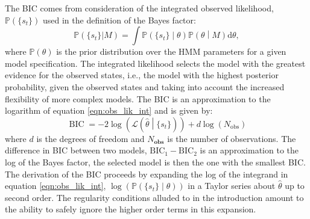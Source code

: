 The BIC comes from consideration of the integrated observed likelihood, $\mathbb{P}\left(\{s_t\}\right)$ used in the definition of the Bayes factor: 
\begin{equation}\label{eqn:obs_lik_int}
       \mathbb{P}\left(\{s_t\}|M\right) = \int \mathbb{P}\left(\{s_t\}\middle|\theta \right)\mathbb{P}\left(\theta \middle | M\right) \mathrm{d}\theta,
\end{equation}
where $\mathbb{P}(\theta)$ is the prior distribution over the HMM parameters for a given model specification. The integrated likelihood selects the model with the greatest evidence for the observed states, i.e., the model with the highest posterior probability, given the observed states and taking into account the increased flexibility of more complex models. \cite{mackay2003information}\cite{kassBayesFactors1995} The BIC is an approximation to the logarithm of equation \ref{eqn:obs_lik_int} and is given by:\cite{schwarzEstimatingDimensionModel1978a}
\begin{equation}\label{eqn:bic}
    \operatorname{BIC} = -2\log{\left(\mathcal{L}\left(\hat{\theta}\middle| \{s_t\}\right)\right)} + d\log{\left(N_{\mathrm{obs}}\right)}
\end{equation}
where $d$ is the degrees of freedom and $N_{\mathbf{obs}}$ is the number of observations.  The difference in BIC between two models, $\mathrm{BIC}_{1}-\mathrm{BIC}_{2}$ is an approximation to the log of the Bayes factor, the selected model is then the one with the smallest BIC.  The derivation of the BIC proceeds by expanding the log of the integrand in equation \ref{eqn:obs_lik_int},  $\log{\left(\mathbb{P}\left(\{s_{t}\}\middle |\theta \right)\right)}$ in a Taylor series about $\hat{\theta}$ up to second order. The regularity conditions alluded to in the introduction amount to the ability to safely ignore the higher order terms in this expansion.\cite{mclachlanFiniteMixtureModels2000}

